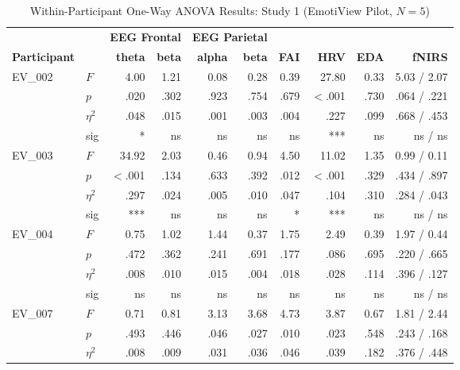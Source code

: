 \begin{table}[htbp]
    \centering
    \small
    \setlength{\tabcolsep}{5pt}
    \caption{Within-Participant One-Way \gls{ANOVA} Results: Study 1 (EmotiView Pilot, $N = 5$)}
    \label{tab:pilot_anova}
    \begin{tabular}{llrrrrrrrr}
        \hline
        & & \multicolumn{2}{c}{\textbf{EEG Frontal}} & \multicolumn{2}{c}{\textbf{EEG Parietal}} & & & & \\
        \cline{3-4}\cline{5-6}
        \textbf{Participant} & & \textbf{theta} & \textbf{beta} & \textbf{alpha} & \textbf{beta} & \textbf{FAI} & \textbf{HRV} & \textbf{EDA} & \textbf{fNIRS} \\
        \hline
        EV\_002 & $F$ & 4.00 & 1.21 & 0.08 & 0.28 & 0.39 & 27.80 & 0.33 & 5.03 / 2.07 \\
               & $p$ & .020 & .302 & .923 & .754 & .679 & $<$.001 & .730 & .064 / .221 \\
               & $\eta^2$ & .048 & .015 & .001 & .003 & .004 & .227 & .099 & .668 / .453 \\
               & sig & * & ns & ns & ns & ns & *** & ns & ns / ns \\
        \hline
        EV\_003 & $F$ & 34.92 & 2.03 & 0.46 & 0.94 & 4.50 & 11.02 & 1.35 & 0.99 / 0.11 \\
               & $p$ & $<$.001 & .134 & .633 & .392 & .012 & $<$.001 & .329 & .434 / .897 \\
               & $\eta^2$ & .297 & .024 & .005 & .010 & .047 & .104 & .310 & .284 / .043 \\
               & sig & *** & ns & ns & ns & * & *** & ns & ns / ns \\
        \hline
        EV\_004 & $F$ & 0.75 & 1.02 & 1.44 & 0.37 & 1.75 & 2.49 & 0.39 & 1.97 / 0.44 \\
               & $p$ & .472 & .362 & .241 & .691 & .177 & .086 & .695 & .220 / .665 \\
               & $\eta^2$ & .008 & .010 & .015 & .004 & .018 & .028 & .114 & .396 / .127 \\
               & sig & ns & ns & ns & ns & ns & ns & ns & ns / ns \\
        \hline
        EV\_007 & $F$ & 0.71 & 0.81 & 3.13 & 3.68 & 4.73 & 3.87 & 0.67 & 1.81 / 2.44 \\
               & $p$ & .493 & .446 & .046 & .027 & .010 & .023 & .548 & .243 / .168 \\
               & $\eta^2$ & .008 & .009 & .031 & .036 & .046 & .039 & .182 & .376 / .448 \\

\end{tabular}
\end{table}
